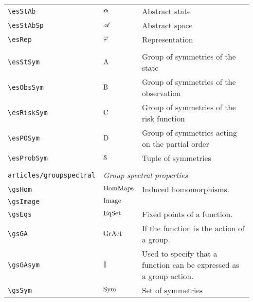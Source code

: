 \begin{longtable}{lll}
 \hline
{\color[rgb]{0.5,0.5,0.5}\texttt{\textbackslash esStAb}} & $\boldsymbol{\alpha}$ &  Abstract state\\ 
 {\color[rgb]{0.5,0.5,0.5}\texttt{\textbackslash esStAbSp}} & $\mathscr{A}$ &  Abstract space\\ 
 {\color[rgb]{0.5,0.5,0.5}\texttt{\textbackslash esRep}} & $\varphi$ &  Representation\\ 
  &  & {\setlength\fboxsep{1pt}%
\fbox{%
\color[rgb]{0.5,0.5,0.5}\begin{minipage}[]{8cm}%
$\esRep: \esSt \mapsto \esStAb$.\par%
{\small{\texttt{\$\textbackslash esRep: \textbackslash esSt \textbackslash mapsto \textbackslash esStAb\$.}}}\end{minipage}%
}%
}%
\\ 
 {\color[rgb]{0.5,0.5,0.5}\texttt{\textbackslash esStSym}} & $\mathrm{A}$ &  Group of symmetries of the state\\ 
 {\color[rgb]{0.5,0.5,0.5}\texttt{\textbackslash esObsSym}} & $\mathrm{B}$ &  Group of symmetries of the observation\\ 
 {\color[rgb]{0.5,0.5,0.5}\texttt{\textbackslash esRiskSym}} & $\mathrm{C}$ &  Group of symmetries of the risk function\\ 
 {\color[rgb]{0.5,0.5,0.5}\texttt{\textbackslash esPOSym}} & $\mathrm{D}$ &  Group of symmetries acting on the partial order\\ 
 {\color[rgb]{0.5,0.5,0.5}\texttt{\textbackslash esProbSym}} & $\mathcal{S}$ &  Tuple of symmetries\\ 
  &  & \\ 
 {\color[rgb]{0.5,0.5,0.5}\texttt{articles/groupspectral}} & \multicolumn{2}{l}{\emph{Group spectral properties}}\\ 
 \hline
{\color[rgb]{0.5,0.5,0.5}\texttt{\textbackslash gsHom}} & $\text{HomMaps}$ &  Induced homomorphisms.\\ 
 {\color[rgb]{0.5,0.5,0.5}\texttt{\textbackslash gsImage}} & $\text{Image}$ &  \\ 
 {\color[rgb]{0.5,0.5,0.5}\texttt{\textbackslash gsEqs}} & $\text{EqSet}$ &  Fixed points of a function.\\ 
 {\color[rgb]{0.5,0.5,0.5}\texttt{\textbackslash gsGA}} & $\text{GrAct}$ &  If the function is the action of a group.\\ 
 {\color[rgb]{0.5,0.5,0.5}\texttt{\textbackslash gsGAsym}} & $\parallel$ &  Used to specify that a function can be expressed as a group action.\\ 
 {\color[rgb]{0.5,0.5,0.5}\texttt{\textbackslash gsSym}} & $\text{Sym}$ &  Set of symmetries\\ 

\end{longtable}
